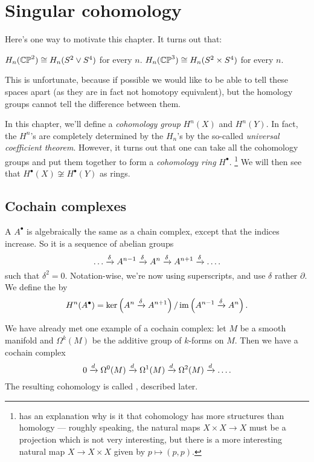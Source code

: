 \chapter{Singular cohomology}
\label{ch:singular_cohomology}
Here's one way to motivate this chapter. It turns out that:
\begin{itemize}
	\ii $H_n(\mathbb{CP}^2) \cong H_n(S^2 \vee S^4)$ for every $n$.
	\ii $H_n(\mathbb{CP}^3) \cong H_n(S^2 \times S^4)$ for every $n$.
\end{itemize}
This is unfortunate, because if possible we would like
to be able to tell these spaces apart (as they are
in fact not homotopy equivalent), but the homology groups
cannot tell the difference between them.

In this chapter, we'll define a \emph{cohomology group} $H^n(X)$ and $H^n(Y)$.
In fact, the $H^n$'s are completely determined by the $H_n$'s
by the so-called \emph{universal coefficient theorem}.
However, it turns out that one can take all the cohomology groups and put
them together to form a \emph{cohomology ring} $H^\bullet$.%
\footnote{\cite{ref:hatcher} has an explanation why is it that cohomology has more structures than
homology --- roughly speaking, the natural maps $X \times X \to X$ must be a projection which is not
very interesting, but there is a more interesting natural map $X \to X \times X$ given by $p \mapsto
(p, p)$.}
We will then see that $H^\bullet(X) \not\cong H^\bullet(Y)$ as rings.

\section{Cochain complexes}
\begin{definition}
A  $A^\bullet$ is algebraically the same as a chain complex,
except that the indices increase.
So it is a sequence of abelian groups
\[ \dots \xrightarrow{\delta} A^{n-1} \xrightarrow{\delta} A^n \xrightarrow{\delta} A^{n+1} \xrightarrow{\delta} \dots. \]
such that $\delta^2 = 0$.
Notation-wise, we're now using superscripts, and use $\delta$ rather $\partial$.
We define the  by
\[ H^n(A^\bullet) = \ker\left( A^n \xrightarrow{\delta} A^{n+1} \right)
	/ \operatorname{im}\left( A^{n-1} \xrightarrow{\delta} A^n \right). \]
\end{definition}

\begin{example}
	We have already met one example of a cochain complex:
	let $M$ be a smooth manifold and $\Omega^k(M)$ be the
	additive group of $k$-forms on $M$.
	Then we have a cochain complex
	\[ 0 \xrightarrow{d} \Omega^0(M)
		\xrightarrow{d} \Omega^1(M) \xrightarrow{d} \Omega^2(M)
		\xrightarrow{d} \dots. \]
	The resulting cohomology is called ,
	described later.
\end{example}

